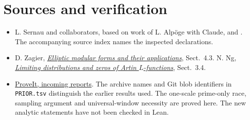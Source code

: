 \documentclass[11pt]{article}
\begin{document}
\section*{Sources and verification}
\begin{itemize}
\item L. Sernau and collaborators, based on work of L. Alp\"oge with Claude,  and . The accompanying source index names the inspected declarations.
\item D. Zagier, \href{https://www.its.caltech.edu/~matilde/Zagier123ModularForms.pdf}{\emph{Elliptic modular forms and their applications}}, Sect.~4.3. N. Ng, \href{https://www.cs.uleth.ca/~nathanng/RESEARCH/phd.thesis.pdf}{\emph{Limiting distributions and zeros of Artin $L$-functions}}, Sect.~3.4.
\item \href{https://github.com/VladimirReshetnikov/ProveIt/tree/28ad287a8d13c0f864ebb51c7c053ad06aa6e585/docs/incoming}{ProveIt, incoming reports}. The archive names and Git blob identifiers in \texttt{PRIOR.tsv} distinguish the earlier results used. The one-scale prime-only race, sampling argument and universal-window necessity are proved here. The new analytic statements have not been checked in Lean.
\end{itemize}
\end{document}
